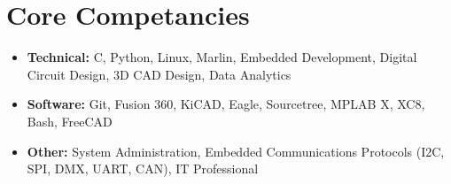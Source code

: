 \documentclass[
	10pt, %
]{FreemanCV}
\begin{document}
\section{Core Competancies}
\begin{itemize}
	\itemsep 0pt
	\item \textbf{Technical:} C, Python, Linux, Marlin, Embedded Development, Digital Circuit Design, 3D CAD Design, Data Analytics
	\item \textbf{Software:} Git, Fusion 360, KiCAD, Eagle, Sourcetree, MPLAB X, XC8, Bash, FreeCAD
	\item \textbf{Other:} System Administration, Embedded Communications Protocols (I2C, SPI, DMX, UART, CAN), IT Professional
\end{itemize}
\end{document}
